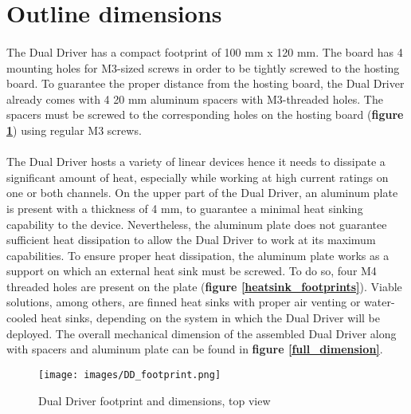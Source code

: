 \newpage
\section{Outline dimensions}

\paragraph{} The Dual Driver has a compact footprint of 100 mm x 120 mm. The board has 4 mounting holes for M3-sized screws in order to be tightly screwed to the hosting board. \newline
To guarantee the proper distance from the hosting board, the Dual Driver already comes with 4 20 mm aluminum spacers with M3-threaded holes. The spacers must be screwed to the corresponding holes on the hosting board (\textbf{figure \ref{DD_footprints}}) using regular M3 screws. \newline

\paragraph{}The Dual Driver hosts a variety of linear devices hence it needs to dissipate a significant amount of heat, especially while working at high current ratings on one or both channels. \newline
On the upper part of the Dual Driver, an aluminum plate is present with a thickness of 4 mm, to guarantee a minimal heat sinking capability to the device. Nevertheless, the aluminum plate does not guarantee sufficient heat dissipation to allow the Dual Driver to work at its maximum capabilities. \newline
To ensure proper heat dissipation, the aluminum plate works as a support on which an external heat sink must be screwed. To do so, four M4 threaded holes are present on the plate (\textbf{figure \ref{heatsink_footprints}}). Viable solutions, among others, are finned heat sinks with proper air venting or water-cooled heat sinks, depending on the system in which the Dual Driver will be deployed. \newline
The overall mechanical dimension of the assembled Dual Driver along with spacers and aluminum plate can be found in \textbf{figure \ref{full_dimension}}.

\begin{figure}
    \centering
    \texttt{[image: images/DD\_footprint.png]}
    \caption{Dual Driver footprint and dimensions, top view}
    \label{DD_footprints}
\end{figure}

